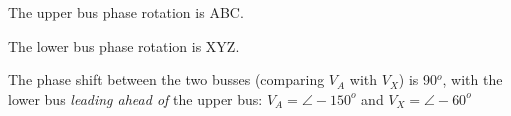 The upper bus phase rotation is ABC.

\vskip 10pt

The lower bus phase rotation is XYZ.

\vskip 10pt

The phase shift between the two busses (comparing $V_A$ with $V_X$) is 90$^{o}$, with the lower bus {\it leading ahead of} the upper bus: $V_A = \angle -150^o$ and $V_X = \angle -60^o$










